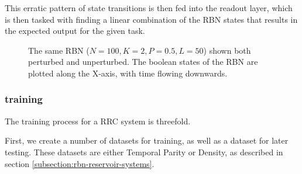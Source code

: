 This erratic pattern of state transitions is then fed into the readout layer,
which is then tasked with finding a linear combination of the RBN states that results in the expected output for the given task.

\begin{figure}
  \caption{
    The same RBN ($N=100, K=2, P=0.5, L=50$) shown both perturbed and unperturbed.
    The boolean states of the RBN are plotted along the X-axis,
    with time flowing downwards.
  }
\end{figure}

\subsubsection{training}

The training process for a RRC system is threefold.

First, we create a number of datasets for training,
as well as a dataset for later testing.
These datasets are either Temporal Parity or Density,
as described in section \ref{subsection:rbn-reservoir-systems}.

